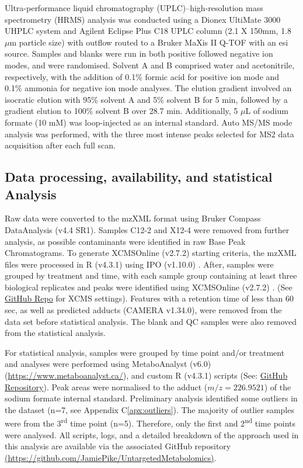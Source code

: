 Ultra-performance liquid chromatography (UPLC)–high-resolution mass spectrometry (HRMS) analysis was conducted using a Dionex UltiMate 3000 UHPLC system and Agilent Eclipse Plus C18 UPLC column (2.1 X 150mm, 1.8 \(\mu\)m particle size) with outflow routed to a Bruker MaXis II Q-TOF with an \ac{esi} source. Samples and blanks were run in both positive followed negative ion modes, and were randomised. Solvent A and B comprised water and acetonitrile, respectively, with the addition of 0.1\% formic acid for positive ion mode and 0.1\% ammonia for negative ion mode analyses. The elution gradient involved an isocratic elution with 95\% solvent A and 5\% solvent B for 5 min, followed by a gradient elution to 100\% solvent B over 28.7 min. Additionally, 5 \(\mu\)L of sodium formate (10 mM) was loop-injected as an internal standard. Auto MS/MS mode analysis was performed, with the three most intense peaks selected for MS2 data acquisition after each full scan.

\subsection{Data processing, availability, and statistical Analysis}
\label{sec:XCMS}
Raw data were converted to the mzXML format using Bruker Compass DataAnalysis (v4.4 SR1). Samples C12-2 and X12-4 were removed from further analysis, as possible contaminants were identified in raw Base Peak Chromatograms. To generate XCMSOnline (v2.7.2) \parencite{Gowda2014} starting criteria, the mzXML files were processed in R (v4.3.1) \parencite{R} using IPO (v1.10.0) \parencite{Libiseller2015}. After, samples were grouped by treatment and time, with each sample group containing at least three biological replicates and peaks were identified using XCMSOnline (v2.7.2) \parencite{Gowda2014}. (See \href{https://github.com/JamiePike/UntargetedMetabolomics/tree/main/NovDec22/XCMS}{GitHub Repo} for XCMS settings). Features with a retention time of less than 60 sec, as well as predicted adducts (CAMERA v1.34.0), were removed from the data set before statistical analysis. The blank and QC samples were also removed from the statistical analysis.

For statistical analysis, samples were grouped by time point and/or treatment and analyses were performed using MetaboAnalyst (v6.0) (\href{https://www.metaboanalyst.ca/}{https://www.metaboanalyst.ca/}), and custom R (v4.3.1) \parencite{R} scripts (See: \href{https://github.com/JamiePike/UntargetedMetabolomics/tree/main}{GitHub Repository}). Peak areas were normalised to the   adduct ($m/z=226.9521$) of the sodium formate internal standard.  Preliminary analysis identified some outliers in the dataset (n=7, see Appendix C\ref{apx:outliers}). The majority of outlier samples were from the 3\textsuperscript{rd} time point (n=5). Therefore, only the first and 2\textsuperscript{nd} time points were analysed. All scripts, logs, and a detailed breakdown of the approach used in this analysis are available via the associated GitHub repository \href{https://github.com/JamiePike/UntargetedMetabolomics}{ (https://github.com/JamiePike/UntargetedMetabolomics)}. 

